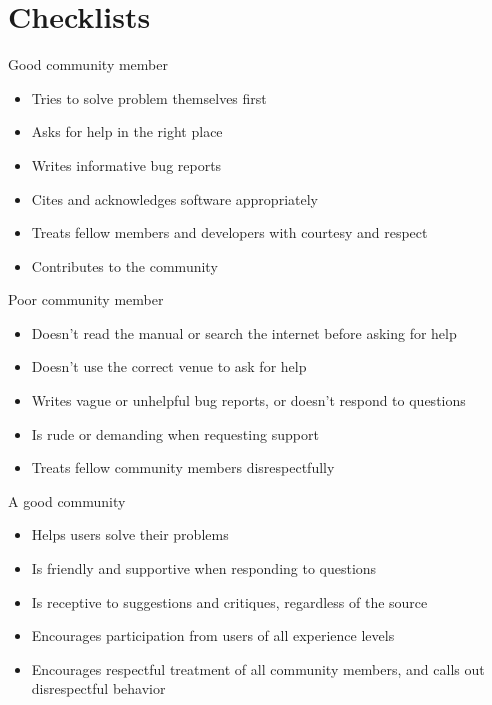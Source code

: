 \documentclass[9pt,training]{livecoms}
\begin{document}
\section{Checklists}
\begin{Checklists}

\begin{checklist}{Good community member}
\begin{itemize}
\item Tries to solve problem themselves first
\item Asks for help in the right place
\item Writes informative bug reports
\item Cites and acknowledges software appropriately
\item Treats fellow members and developers with courtesy and respect
\item Contributes to the community
\end{itemize}
\end{checklist}

\begin{checklist}{Poor community member}
\begin{itemize}
\item Doesn't read the manual or search the internet before asking for help
\item Doesn't use the correct venue to ask for help
\item Writes vague or unhelpful bug reports, or doesn't respond to questions
\item Is rude or demanding when requesting support
\item Treats fellow community members disrespectfully
\end{itemize}
\end{checklist}

\begin{checklist}{A good community}
\begin{itemize}
\item Helps users solve their problems
\item Is friendly and supportive when responding to questions
\item Is receptive to suggestions and critiques, regardless of the source
\item Encourages participation from users of all experience levels
\item Encourages respectful treatment of all community members, and calls out disrespectful behavior
\end{itemize}
\end{checklist}

\end{Checklists}
\end{document}
